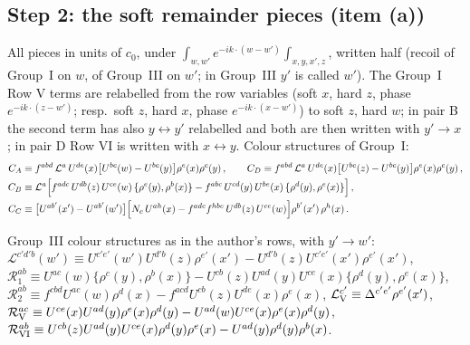 \subsection{Step 2: the soft remainder pieces (item (a))}
\noindent All pieces in units of $c_{0}$, under $\int_{w,w'}e^{-ik\cdot(w-w')}\int_{x,y,x',z}$, written half (recoil of Group~I on $w$, of Group~III on $w'$; in Group~III $y'$ is called $w'$). The Group~I Row V terms are relabelled from the row variables (soft $x$, hard $z$, phase $e^{-ik\cdot(z-w')}$; resp.\ soft $z$, hard $x$, phase $e^{-ik\cdot(x-w')}$) to soft $z$, hard $w$; in pair B the second term has also $y\leftrightarrow y'$ relabelled and both are then written with $y'\to x$; in pair D Row VI is written with $x\leftrightarrow y$. Colour structures of Group~I:
\begin{align}
C_{A}&\equiv f^{abd}\,\mathcal{L}^{a}\,U^{de}(x)\big[U^{bc}(w)-U^{bc}(y)\big]\rho^{e}(x)\rho^{c}(y)\,,\qquad
C_{D}\equiv f^{abd}\,\mathcal{L}^{a}\,U^{de}(x)\big[U^{bc}(z)-U^{bc}(y)\big]\rho^{e}(x)\rho^{c}(y)\,,\notag\\
C_{B}&\equiv \mathcal{L}^{a}\Big[f^{adc}\,U^{db}(z)\,U^{ce}(w)\,\{\rho^{e}(y),\rho^{b}(x)\}-f^{abc}\,U^{cd}(y)\,U^{be}(x)\,\{\rho^{d}(y),\rho^{e}(x)\}\Big]\,,\label{sf:col}\\
C_{C}&\equiv\big[U^{ab'}(x')-U^{ab'}(w')\big]\Big[N_{c}\,U^{ah}(x)-f^{adc}f^{hbe}\,U^{db}(z)\,U^{ce}(w)\Big]\rho^{b'}(x')\,\rho^{h}(x)\,.\notag
\end{align}
{\sloppy Group~III colour structures as in the author's rows, with $y'\to w'$: $\mathcal{L}^{c'd'b}(w')\equiv U^{c'e'}(w')U^{d'b}(z)\rho^{e'}(x')-U^{d'b}(z)U^{c'e'}(x')\rho^{e'}(x')$, $\mathcal{R}_{1}^{ab}\equiv U^{ac}(w)\{\rho^{c}(y),\rho^{b}(x)\}-U^{cb}(z)U^{ad}(y)U^{ce}(x)\{\rho^{d}(y),\rho^{e}(x)\}$, $\mathcal{R}_{2}^{ab}\equiv f^{cbd}U^{ac}(w)\rho^{d}(x)-f^{acd}U^{cb}(z)U^{de}(x)\rho^{e}(x)$, $\mathcal{L}_{\rm V}^{c'}\equiv\Delta^{c'e'}\rho^{e'}(x')$, $\mathcal{R}_{\rm V}^{ac}\equiv U^{ce}(x)U^{ad}(y)\rho^{e}(x)\rho^{d}(y)-U^{ad}(w)U^{ce}(x)\rho^{e}(x)\rho^{d}(y)$, $\mathcal{R}_{\rm VI}^{ab}\equiv U^{cb}(z)U^{ad}(y)U^{ce}(x)\rho^{d}(y)\rho^{e}(x)-U^{ad}(y)\rho^{d}(y)\rho^{b}(x)$.\par}

